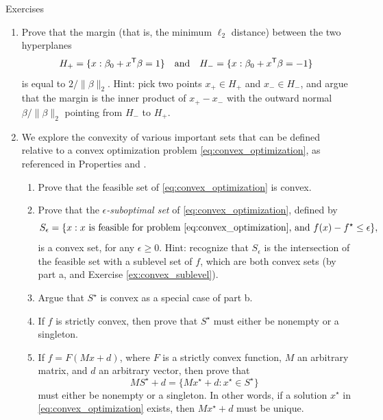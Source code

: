\begin{xcb}{Exercises}
\begin{enumerate}[label=\thechapter.\arabic*]
\settowidth{\leftmargini}{0.00.\hskip\labelsep}
\item \label{ex:svm_margin} 
  Prove that the margin (that is, the minimum $\ell_2$ distance) between the two
  hyperplanes  
  \[
  H_+ = \{x : \beta_0 + x^{\mathsf{T}} \beta = 1\} \quad \text{and} \quad 
  H_- = \{x : \beta_0 + x^{\mathsf{T}} \beta = -1\}
  \] 
  is equal to $2/\|\beta\|_2$. Hint: pick two points $x_+ \in H_+$ and $x_- \in
  H_-$, and argue that the margin is the inner product of $x_+-x_-$ with the
  outward normal $\beta/\|\beta\|_2$ pointing from $H_-$ to $H_+$.  

\item \label{ex:convex_solution} 
  We explore the convexity of various important sets that can be defined
  relative to a convex optimization problem \eqref{eq:convex_optimization}, as
  referenced in Properties  and
  . 

\begin{enumerate}[label=\alph*.]
\item Prove that the feasible set of \eqref{eq:convex_optimization} is convex. 

\item Prove that the \emph{$\epsilon$-suboptimal set} of
  \eqref{eq:convex_optimization}, defined by 
  \[
  S_\epsilon = \{ x : \text{$x$ is feasible for problem
    \eqref{eq:convex_optimization}, and $f(x) - f^\star \leq \epsilon$} \},
  \]
  is a convex set, for any $\epsilon \geq 0$. Hint: recognize that $S_\epsilon$
  is the intersection of the feasible set with a sublevel set of $f$, which are
  both convex sets (by part a, and Exercise \ref{ex:convex_sublevel}). 

\item Argue that $S^\star$ is convex as a special case of part b.

\item If $f$ is strictly convex, then prove that $S^\star$ must either be
  nonempty or a singleton.

\item If $f=F(Mx+d)$, where $F$ is a strictly convex function, $M$ an arbitrary
  matrix, and $d$ an arbitrary vector, then prove that  
  \[
  M S^\star + d = \{ M x^\star + d : x^\star \in S^\star \}
  \]
  must either be nonempty or a singleton. In other words, if a solution
  $x^\star$ in \eqref{eq:convex_optimization} exists, then $Mx^\star + d$ must 
  be unique. 
\end{enumerate}


\end{enumerate}
\end{xcb}
